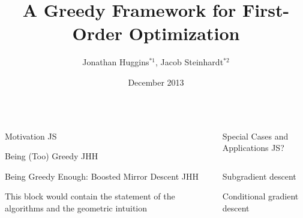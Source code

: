 \documentclass[final]{beamer}
\title%
{A Greedy Framework for First-Order Optimization}
\author%
{Jonathan Huggins$^{*1}$, Jacob Steinhardt$^{*2}$}
\institute[] %
{$^{*}$Both authors contributed equally to this work. $^1$Massachusetts Institute of Technology. $^{2}$Stanford University.}
\date{December 2013}
\begin{document}
\begin{frame}{} 
\begin{columns}
\begin{column}{0.48\linewidth}


\begin{block}{\large Motivation}
JS
\end{block}

\begin{block}{\large Being (Too) Greedy}
JHH
\end{block}

\begin{block}{\large Being Greedy Enough: Boosted Mirror Descent}
JHH

This block would contain the statement of the algorithms and the geometric intuition 
\end{block}
\end{column}	

	


\begin{column}{0.48\linewidth}

\begin{block}{\large Special Cases and Applications}
JS?
\begin{columns}[t]
\begin{column}{0.45\linewidth}

\begin{block}{Subgradient descent}

\end{block}

\begin{block}{Conditional gradient descent}
\end{block}


\end{column}
\end{columns}
\end{block}
\end{column}
\end{columns}
\end{frame}
\end{document}
